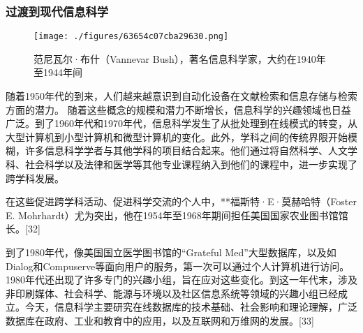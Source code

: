 \subsubsection{过渡到现代信息科学}
\begin{figure}[ht]
\centering
\texttt{[image: ./figures/63654c07cba29630.png]}
\caption{范尼瓦尔·布什（Vannevar Bush），著名信息科学家，大约在1940年至1944年间} \label{fig_INCE_4}
\end{figure}
随着1950年代的到来，人们越来越意识到自动化设备在文献检索和信息存储与检索方面的潜力。  
随着这些概念的规模和潜力不断增长，信息科学的兴趣领域也日益广泛。到了1960年代和1970年代，信息科学发生了从批处理到在线模式的转变，从大型计算机到小型计算机和微型计算机的变化。此外，学科之间的传统界限开始模糊，许多信息科学学者与其他学科的项目结合起来。他们通过将自然科学、人文学科、社会科学以及法律和医学等其他专业课程纳入到他们的课程中，进一步实现了跨学科发展。

在这些促进跨学科活动、促进科学交流的个人中，**福斯特·E·莫赫哈特（Foster E. Mohrhardt）尤为突出，他在1954年至1968年期间担任美国国家农业图书馆馆长。[32]

到了1980年代，像美国国立医学图书馆的“Grateful Med”大型数据库，以及如Dialog和Compuserve等面向用户的服务，第一次可以通过个人计算机进行访问。1980年代还出现了许多专门的兴趣小组，旨在应对这些变化。到这一年代末，涉及非印刷媒体、社会科学、能源与环境以及社区信息系统等领域的兴趣小组已经成立。今天，信息科学主要研究在线数据库的技术基础、社会影响和理论理解，广泛数据库在政府、工业和教育中的应用，以及互联网和万维网的发展。[33]